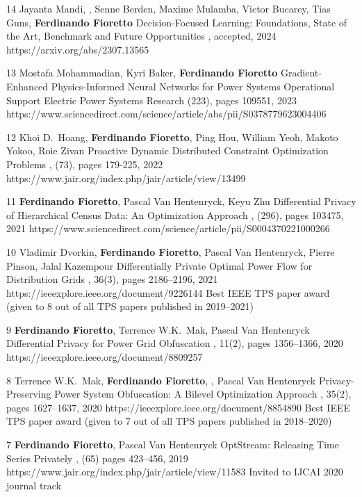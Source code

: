\begin{pubs}
\journalentry
	{14}
	{Jayanta Mandi, , Senne Berden, Maxime Mulamba, Victor Bucarey, Tias Guns, {\bf Ferdinando Fioretto}} 
	{Decision-Focused Learning: Foundations, State of the Art, Benchmark and Future Opportunities}
	{\JAIR, accepted, 2024}
	{https://arxiv.org/abs/2307.13565}

	\journalentry
	{13}
	{Mostafa Mohammadian, Kyri Baker, \textbf{Ferdinando Fioretto}}
	{Gradient-Enhanced Physics-Informed Neural Networks for Power Systems Operational Support}
	{Electric Power Systems Research (223), pages 109551, 2023}
	{https://www.sciencedirect.com/science/article/abs/pii/S0378779623004406}

	\journalentry
	{12} %
	{Khoi D.~Hoang, \textbf{Ferdinando Fioretto}, Ping Hou, William Yeoh, Makoto Yokoo, Roie Zivan}
	{Proactive Dynamic Distributed Constraint Optimization Problems}
	{\JAIR, (73), pages 179-225, 2022}
	{https://www.jair.org/index.php/jair/article/view/13499}

	\journalentry
	{11} %
		{\textbf{Ferdinando Fioretto}, Pascal Van Hentenryck, Keyu Zhu}
		{Differential Privacy of Hierarchical Census Data: An Optimization Approach}
		{\AIJ, (296), pages 103475, 2021}
		{https://www.sciencedirect.com/science/article/pii/S0004370221000266}

	\journalentryAwd
	{10} %
		{Vladimir Dvorkin, {\bf Ferdinando Fioretto}, Pascal Van Hentenryck, Pierre Pinson, Jalal Kazempour}
		{Differentially Private Optimal Power Flow for Distribution Grids}
		{\TPS, 36(3), pages 2186--2196, 2021}
		{https://ieeexplore.ieee.org/document/9226144}
		{Best IEEE TPS paper award}
		{(given to 8 out of all TPS papers published in 2019--2021)}

	\journalentry
	{9} %
		{{\bf Ferdinando Fioretto}, Terrence W.K.~Mak, Pascal Van Hentenryck}
		{Differential Privacy for Power Grid Obfuscation}
		{\TSG, 11(2), pages 1356--1366, 2020}
		{https://ieeexplore.ieee.org/document/8809257}

	\journalentryAwd
	{8}	%
		{Terrence W.K.~Mak, {\bf Ferdinando Fioretto}, , Pascal Van Hentenryck}
		{Privacy-Preserving Power System Obfuscation: A Bilevel Optimization Approach}
		{\TPS, 35(2), pages 1627--1637, 2020}
		{https://ieeexplore.ieee.org/document/8854890}
		{Best IEEE TPS paper award}
		{(given to 7 out of all TPS papers published in 2018--2020)}

	\journalentryAwd
	{7}	%
		{{\bf Ferdinando Fioretto}, Pascal Van Hentenryck}
		{OptStream: Releasing Time Series Privately}
		{\JAIR, (65) pages 423--456, 2019}
		{https://www.jair.org/index.php/jair/article/view/11583}
		{Invited to IJCAI 2020 journal track}
		{}


\end{pubs}
